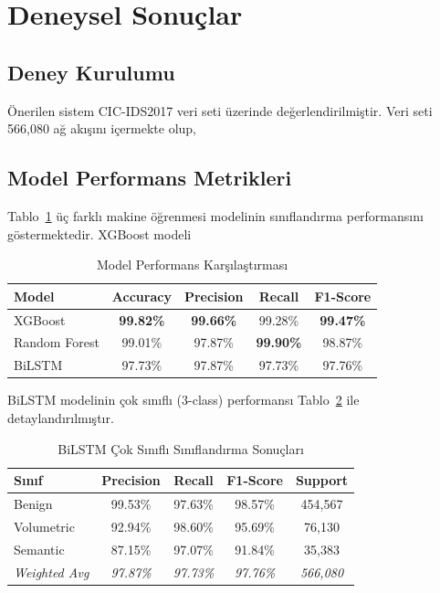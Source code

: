 
\section{Deneysel Sonuçlar}

\subsection{Deney Kurulumu}

Önerilen sistem CIC-IDS2017 veri seti üzerinde değerlendirilmiştir. Veri seti 566,080 ağ akışını içermekte olup, %

\subsection{Model Performans Metrikleri}

Tablo~\ref{tab:model_comparison} üç farklı makine öğrenmesi modelinin sınıflandırma performansını göstermektedir. XGBoost modeli %

\begin{table}[h]
\centering
\caption{Model Performans Karşılaştırması}
\label{tab:model_comparison}
\begin{tabular}{lcccc}
\hline
\textbf{Model} & \textbf{Accuracy} & \textbf{Precision} & \textbf{Recall} & \textbf{F1-Score} \\
\hline
XGBoost & \textbf{99.82\%} & \textbf{99.66\%} & 99.28\% & \textbf{99.47\%} \\
Random Forest & 99.01\% & 97.87\% & \textbf{99.90\%} & 98.87\% \\
BiLSTM & 97.73\% & 97.87\% & 97.73\% & 97.76\% \\
\hline
\end{tabular}
\end{table}

BiLSTM modelinin çok sınıflı (3-class) performansı Tablo~\ref{tab:bilstm_classes} ile detaylandırılmıştır.

\begin{table}[h]
\centering
\caption{BiLSTM Çok Sınıflı Sınıflandırma Sonuçları}
\label{tab:bilstm_classes}
\begin{tabular}{lcccc}
\hline
\textbf{Sınıf} & \textbf{Precision} & \textbf{Recall} & \textbf{F1-Score} & \textbf{Support} \\
\hline
Benign & 99.53\% & 97.63\% & 98.57\% & 454,567 \\
Volumetric & 92.94\% & 98.60\% & 95.69\% & 76,130 \\
Semantic & 87.15\% & 97.07\% & 91.84\% & 35,383 \\
\hline
\textit{Weighted Avg} & \textit{97.87\%} & \textit{97.73\%} & \textit{97.76\%} & \textit{566,080} \\
\hline
\end{tabular}
\end{table}


